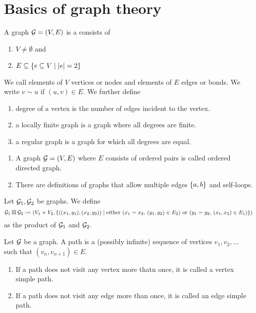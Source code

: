 \section{Basics of graph theory}

\begin{defn}[Graph]
    A graph \(\mathcal{G}=(V,E)\) is a consists of 
    \begin{enumerate}
      \item \(V \neq \emptyset\) and
      \item \(E \subseteq \left\{ {e\subseteq V \; \vert \; \abs{e}=2} \right\}\)
    \end{enumerate}
    We call elements of $V$ vertices or nodes and elements of \(E\) edges or bonds. We write $v\sim u$ if \((u,v)\in E\). We further define 
    \begin{enumerate}
      \item degree of a vertex is the number of edges incident to the vertex.
      \item a locally finite graph is a graph where all degrees are finite.
      \item a regular graph is a graph for which all degrees are equal.
    \end{enumerate}
    
\end{defn}


\begin{remark}
  \begin{enumerate}
    \item A graph \(\mathcal{G}=(V,E)\) where $E$ consists of ordered pairs is called ordered directed graph.
    \item There are definitions of graphs that allow multiple edges $\left\{ {a,b} \right\}$ and self-loops.
  \end{enumerate}  
\end{remark}


\begin{defn}
    Let $\mathcal{G}_1, \mathcal{G}_2$ be graphs. We define  
    \[\mathcal{G}_1 \boxtimes \mathcal{G}_2:= (V_1\times V_2, \left\{ {((x_1,y_1),(x_2,y_2))\; \vert \; \textrm{either }(x_1=x_2 ,\,(y_1,y_2)\in E_2) \textrm{ or } (y_1=y_2,\,(x_1,x_2)\in E_1)} \right\})\]
    as the product of $\mathcal{G}_1$ and \(\mathcal{G}_2\).
\end{defn}



\begin{defn}[Path]
  Let $\mathcal{G}$ be a graph. A path is a (possibly infinite) sequence of vertices $v_1,v_2,\dots$ such that $(v_n,v_{n+1})\in E$. 
  \begin{enumerate}
    \item If a path does not visit any vertex more thatn once, it is called a vertex simple path.
    \item If a path does not visit any edge more than once, it is called an edge simple path.
  \end{enumerate}
  
\end{defn}


